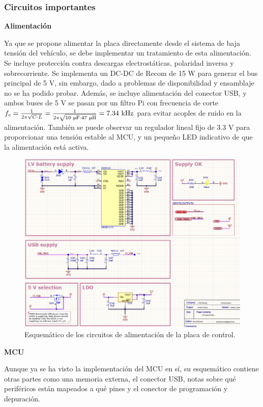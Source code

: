 \subsubsection{Circuitos importantes}

\textbf{Alimentación}

Ya que se propone alimentar la placa directamente desde el sistema de baja tensión del vehículo, se debe implementar un tratamiento de esta alimentación. Se incluye protección contra descargas electrostáticas, polaridad inversa y sobrecorriente. Se implementa un DC-DC de Recom de 15 W para generar el bus principal de 5 V, sin embargo, dado a problemas de disponibilidad y ensamblaje no se ha podido probar. Además, se incluye alimentación del conector USB, y ambos buses de 5 V se pasan por un filtro Pi con frecuencia de corte $f_c = \frac{1}{2 \pi \sqrt{C \cdot L}} = \frac{1}{2 \pi \sqrt{10\text{ }\text{\unit{\micro\farad}} \cdot 47\text{ }\text{\unit{\micro\henry}}}} = 7.34 \text{ kHz}$ para evitar acoples de ruido en la alimentación. También se puede observar un regulador lineal fijo de 3.3 V para proporcionar una tensión estable al MCU, y un pequeño LED indicativo de que la alimentación está activa.

\begin{figure}[H]
	\centering
	\includegraphics[width=0.7\linewidth]{fig/schSUPPcontrol}
	\caption{Esquemático de los circuitos de alimentación de la placa de control.}
\end{figure}

\textbf{MCU}

Aunque ya se ha visto la implementación del MCU en sí, su esquemático contiene otras partes como una memoria externa, el conector USB, notas sobre qué periféricos están mapeados a qué pines y el conector de programación y depuración.

